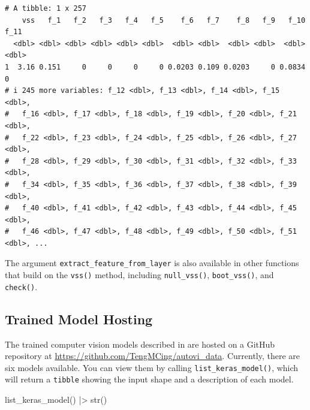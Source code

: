 \documentclass[
doublespace,
  times]{anzsauth}
\newenvironment{Shaded}{\begin{snugshade}}{\end{snugshade}}
\newcommand{\FunctionTok}[1]{\textcolor[rgb]{0.28,0.35,0.67}{#1}}
\newcommand{\NormalTok}[1]{\textcolor[rgb]{0.00,0.23,0.31}{#1}}
\newcommand{\SpecialCharTok}[1]{\textcolor[rgb]{0.37,0.37,0.37}{#1}}
\begin{document}
\begin{verbatim}
# A tibble: 1 x 257
    vss   f_1   f_2   f_3   f_4   f_5    f_6   f_7    f_8   f_9   f_10  f_11
  <dbl> <dbl> <dbl> <dbl> <dbl> <dbl>  <dbl> <dbl>  <dbl> <dbl>  <dbl> <dbl>
1  3.16 0.151     0     0     0     0 0.0203 0.109 0.0203     0 0.0834     0
# i 245 more variables: f_12 <dbl>, f_13 <dbl>, f_14 <dbl>, f_15 <dbl>,
#   f_16 <dbl>, f_17 <dbl>, f_18 <dbl>, f_19 <dbl>, f_20 <dbl>, f_21 <dbl>,
#   f_22 <dbl>, f_23 <dbl>, f_24 <dbl>, f_25 <dbl>, f_26 <dbl>, f_27 <dbl>,
#   f_28 <dbl>, f_29 <dbl>, f_30 <dbl>, f_31 <dbl>, f_32 <dbl>, f_33 <dbl>,
#   f_34 <dbl>, f_35 <dbl>, f_36 <dbl>, f_37 <dbl>, f_38 <dbl>, f_39 <dbl>,
#   f_40 <dbl>, f_41 <dbl>, f_42 <dbl>, f_43 <dbl>, f_44 <dbl>, f_45 <dbl>,
#   f_46 <dbl>, f_47 <dbl>, f_48 <dbl>, f_49 <dbl>, f_50 <dbl>, f_51 <dbl>, ...
\end{verbatim}

The argument \texttt{extract\_feature\_from\_layer} is also available in
other functions that build on the \texttt{vss()} method, including
\texttt{null\_vss()}, \texttt{boot\_vss()}, and \texttt{check()}.

\subsection{Trained Model Hosting}\label{sec-trained-model-hosting}

The trained computer vision models described in \citet{li2024automated}
are hosted on a GitHub repository at
\url{https://github.com/TengMCing/autovi_data}. Currently, there are six
models available. You can view them by calling
\texttt{list\_keras\_model()}, which will return a \texttt{tibble}
showing the input shape and a description of each model.

\begin{Shaded}
\begin{Highlighting}[]
\FunctionTok{list\_keras\_model}\NormalTok{() }\SpecialCharTok{|\textgreater{}}
  \FunctionTok{str}\NormalTok{()}
\end{Highlighting}
\end{Shaded}
\end{document}
